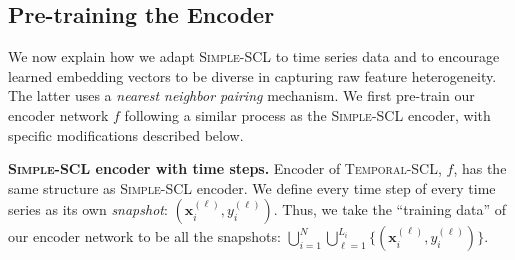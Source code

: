 \documentclass[pmlr,twocolumn,10pt]{jmlr} %
\begin{document}
\vspace{-1em}
\subsection{Pre-training the Encoder}
\label{sec:learning-the-encoder}
\vspace{-.25em}

We now explain how we adapt \textsc{Simple-SCL} to time series data and to encourage learned embedding vectors to be diverse in capturing raw feature heterogeneity. The latter uses a \emph{nearest neighbor pairing} mechanism.
We first pre-train our encoder network $f$ following a similar process as the \textsc{Simple-SCL} encoder, with specific modifications described below.

\vspace{.2em}
\noindent
\textbf{\textsc{Simple-SCL} encoder with time steps.}
Encoder of \textsc{Temporal-SCL}, $f$, has the same structure as \textsc{Simple-SCL} encoder. We define every time step of every time series as its own \emph{snapshot}:  $(\mathbf{x}_i^{(\ell)}, y_i^{(\ell)})$.
Thus, we take the ``training data'' of our encoder network to be all the snapshots: $\bigcup_{i=1}^N \bigcup_{\ell=1}^{L_i} \{ (\mathbf{x}_i^{(\ell)}, y_i^{(\ell)}) \}$.
\end{document}
